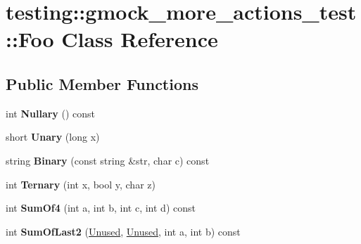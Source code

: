 \hypertarget{classtesting_1_1gmock__more__actions__test_1_1_foo}{}\section{testing\+:\+:gmock\+\_\+more\+\_\+actions\+\_\+test\+:\+:Foo Class Reference}
\label{classtesting_1_1gmock__more__actions__test_1_1_foo}
\subsection*{Public Member Functions}
\begin{DoxyCompactItemize}
\item 
\mbox{\label{classtesting_1_1gmock__more__actions__test_1_1_foo_ad6ba38dbb9b1594ac178630f07c4baa5}} 
int {\bfseries Nullary} () const
\item 
\mbox{\label{classtesting_1_1gmock__more__actions__test_1_1_foo_a68d2b46d6cc7d51979b0254940af6090}} 
short {\bfseries Unary} (long x)
\item 
\mbox{\label{classtesting_1_1gmock__more__actions__test_1_1_foo_a15d8082ba501899c8ac1d93543ed9ad3}} 
string {\bfseries Binary} (const string \&str, char c) const
\item 
\mbox{\label{classtesting_1_1gmock__more__actions__test_1_1_foo_afc5b86988210ad598fa3a2a9822297e4}} 
int {\bfseries Ternary} (int x, bool y, char z)
\item 
\mbox{\label{classtesting_1_1gmock__more__actions__test_1_1_foo_a69ca68e84528904032bad9533a23fb0a}} 
int {\bfseries Sum\+Of4} (int a, int b, int c, int d) const
\item 
\mbox{\label{classtesting_1_1gmock__more__actions__test_1_1_foo_abc041eb7a8e8211656495f2540f315ec}} 
int {\bfseries Sum\+Of\+Last2} (\hyperlink{classtesting_1_1internal_1_1_ignored_value}{Unused}, \hyperlink{classtesting_1_1internal_1_1_ignored_value}{Unused}, int a, int b) const

\end{DoxyCompactItemize}
